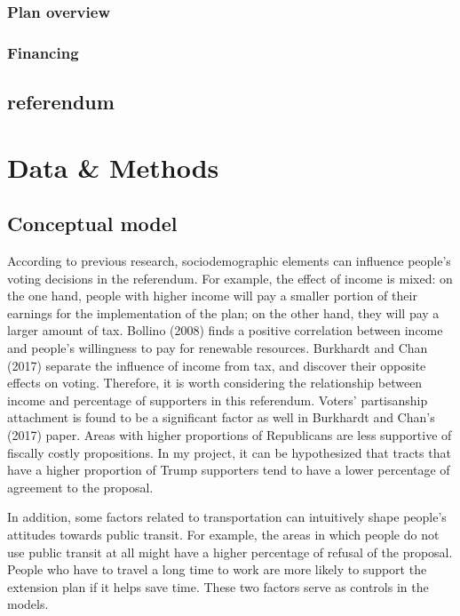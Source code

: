 \documentclass[
]{article}
\begin{document}
\hypertarget{plan-overview}{%
\subsubsection{Plan overview}\label{plan-overview}}

\hypertarget{financing}{%
\subsubsection{Financing}\label{financing}}

\hypertarget{referendum}{%
\subsection{referendum}\label{referendum}}

\hypertarget{data-methods}{%
\section{Data \& Methods}\label{data-methods}}

\hypertarget{conceptual-model}{%
\subsection{Conceptual model}\label{conceptual-model}}

According to previous research, sociodemographic elements can influence
people's voting decisions in the referendum. For example, the effect of
income is mixed: on the one hand, people with higher income will pay a
smaller portion of their earnings for the implementation of the plan; on
the other hand, they will pay a larger amount of tax. Bollino (2008)
finds a positive correlation between income and people's willingness to
pay for renewable resources. Burkhardt and Chan (2017) separate the
influence of income from tax, and discover their opposite effects on
voting. Therefore, it is worth considering the relationship between
income and percentage of supporters in this referendum. Voters'
partisanship attachment is found to be a significant factor as well in
Burkhardt and Chan's (2017) paper. Areas with higher proportions of
Republicans are less supportive of fiscally costly propositions. In my
project, it can be hypothesized that tracts that have a higher
proportion of Trump supporters tend to have a lower percentage of
agreement to the proposal.

In addition, some factors related to transportation can intuitively
shape people's attitudes towards public transit. For example, the areas
in which people do not use public transit at all might have a higher
percentage of refusal of the proposal. People who have to travel a long
time to work are more likely to support the extension plan if it helps
save time. These two factors serve as controls in the models.
\end{document}
